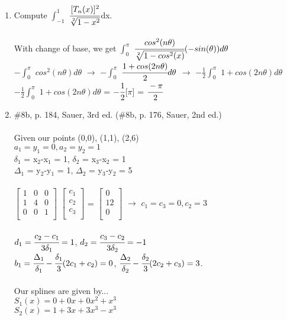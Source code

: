 \documentclass[12pt]{article}
\begin{document}
\begin{enumerate}
	\item Compute $\int^1_{-1}$ $\cfrac{[T_n(x)]^2}{\sqrt[2]{1-x^2}}$dx. \\ \\
	With change of base, we get $\int^\pi_{0}$ $\cfrac{cos^2(n\theta)}{\sqrt[2]{1-cos^2(x)}}(-sin(\theta))d\theta$ \\
	$-\int^\pi_{0}$ $cos^2(n\theta)d\theta$ $\rightarrow$ $-\int^\pi_{0}$ $\cfrac{1+cos(2n\theta)}{2}d\theta$ $\rightarrow$ $-\frac{1}{2}\int^\pi_{0}$ $1+cos(2n\theta)d\theta$ \\
	$-\frac{1}{2}\int^\pi_{0}$ $1+cos(2n\theta)d\theta$ = $-\cfrac{1}{2}$[$\pi$] = $\cfrac{-\pi}{2}$	\\
	
	\item $\#$8b, p. 184, Sauer, 3rd ed. ($\#$8b, p. 176, Sauer, 2nd ed.) \\ \\
	Given our points (0,0), (1,1), (2,6) \\
	$a_1 = y_1 = 0, a_2 = y_2 = 1$ \\
	$\delta_1$ = x$_2$-x$_1$ = 1, $\delta_2$ = x$_3$-x$_2$ = 1 \\
	$\Delta_1$ = y$_2$-y$_1$ = 1, $\Delta_2$ = y$_3$-y$_2$ = 5 \\ \\
	$\begin{bmatrix}
   1 & 0 & 0 \\
   1 & 4 & 0 \\
   0 & 0 & 1 \\
\end{bmatrix}$ 	$\begin{bmatrix}
   c_1  \\
   c_2  \\
   c_3  \\
\end{bmatrix}$ = $\begin{bmatrix}
   0  \\
   12  \\
   0  \\
\end{bmatrix}$ $\rightarrow$ $c_1 = c_3 = 0, c_2 = 3$ \\ \\
$d_1 = \cfrac{c_2 - c_1}{3\delta_1} = 1$, $d_2 = \cfrac{c_3 - c_2}{3\delta_2} = -1$\\
$b_1 = \cfrac{\Delta_1}{\delta_1} - \cfrac{\delta_1}{3}(2c_1+c_2) = 0$, $\cfrac{\Delta_2}{\delta_2} - \cfrac{\delta_2}{3}(2c_2+c_3) = 3$. \\ \\
Our splines are given by... \\
$S_1(x) = 0 + 0x + 0x^2 + x^3$ \\
$S_2(x) = 1 + 3x + 3x^3 - x^3$ \\ 
	

\end{enumerate}
\end{document}
